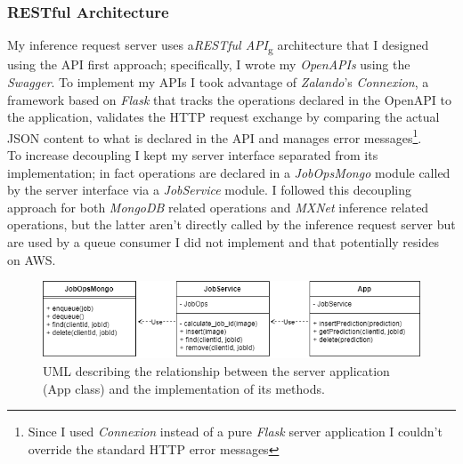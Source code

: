 \subsubsection{RESTful Architecture}
My inference request server uses a\emph{\gls{RESTful API}}\textsubscript{g} architecture that I designed using the API first approach; specifically, I wrote my \emph{OpenAPIs} using the \emph{Swagger}. To implement my APIs I took advantage of \emph{Zalando}'s \emph{Connexion}, a framework based on \emph{Flask} that tracks the operations declared in the OpenAPI to the application, validates the HTTP request exchange by comparing the actual JSON content to what is declared in the API and manages error messages\footnote{Since I used \emph{Connexion} instead of a pure \emph{Flask} server application I couldn't override the standard HTTP error messages}. \\
To increase decoupling I kept my server interface separated from its implementation; in fact operations are declared in a \emph{JobOpsMongo} module called by the server interface via a \emph{JobService} module. I followed this decoupling approach for both \emph{MongoDB} related operations and \emph{MXNet} inference related operations, but the latter aren't directly called by the inference request server but are used by a queue consumer I did not implement and that potentially resides on AWS.

\begin{figure}[htbp]
\begin{center}
\includegraphics[width=\textwidth]{immagini/pictures/jobops.png} 
\caption{UML describing the relationship between the server application (App class) and the implementation of its methods.}
\end{center}
\end{figure}

